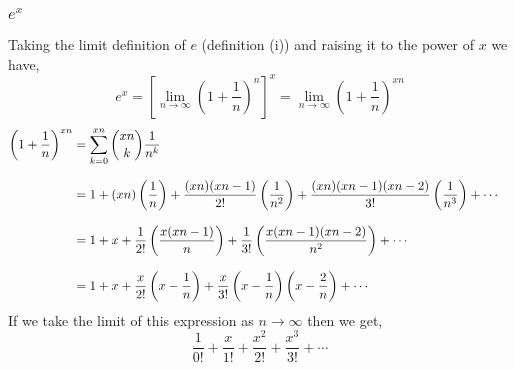 \documentclass[MathsNotesBase.tex]{subfiles}
\begin{document}
{	\subsubsection{\texorpdfstring{$e^x$}{e to the power x}}
	\bigskip
	Taking the limit definition of $e$ (definition (i)) and raising it to the power of $x$ we have,
	\[ e^x = \left[\lim_{n \to \infty} \left(1 + \frac{1}{n}\right)^n\right]^x = \lim_{n \to \infty} \left(1 + \frac{1}{n}\right)^{xn} \]
	\begin{align*}
	\left(1 + \frac{1}{n}\right)^{xn} &= \sum_{k=0}^{xn} {{xn}\choose{k}} \frac{1}{n^k} \\[8pt]
	    &= 1 + (xn)\left(\frac{1}{n}\right) + \frac{(xn)(xn-1)}{2!}\left(\frac{1}{n^2}\right) + \frac{(xn)(xn-1)(xn-2)}{3!}\left(\frac{1}{n^3}\right) + \cdots &\text{\scriptsize{}} \\[8pt]
	    &= 1 + x + \frac{1}{2!}\left(\frac{x(xn-1)}{n}\right) + \frac{1}{3!}\left(\frac{x(xn-1)(xn-2)}{n^2}\right) + \cdots &\text{\scriptsize{}} \\[8pt]
	    &= 1 + x + \frac{x}{2!}\left(x - \frac{1}{n}\right) + \frac{x}{3!}\left(x - \frac{1}{n}\right)\left(x - \frac{2}{n}\right) + \cdots &\text{\scriptsize{}}
	\end{align*}
	If we take the limit of this expression as ${ n \to \infty }$ then we get,
	\[ \frac{1}{0!} + \frac{x}{1!} + \frac{x^2}{2!} + \frac{x^3}{3!} + \cdots \]
}
\end{document}
